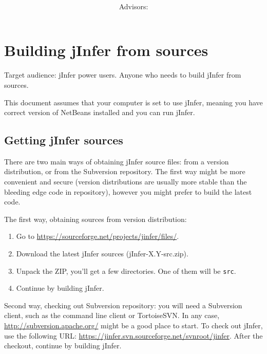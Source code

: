 \documentclass[a4paper,10pt,oneside]{article}
\title{\bf\mftitle}
\author{\mfauthor \\ Advisors: \mfadvisor}
\date{\mfplacedate}
\begin{document}
\maketitle




 
  
 



 \section*{Building jInfer from sources}
\par 
  Target audience: jInfer power users. Anyone who needs to build jInfer from sources.

\par 
  This document assumes that your computer is set to use jInfer, meaning you
    have correct version of NetBeans installed and you can run jInfer.

\subsection*{Getting jInfer sources}
\par 
There are two main ways of obtaining jInfer source files: from a version
  distribution, or from the Subversion repository. The first way might be more
  convenient and secure (version distributions are usually more stable than the
  bleeding edge code in repository), however you might prefer to build the
  latest code.

\par 
\noindent   The first way, obtaining sources from version distribution:
\begin{enumerate}\item 
 Go to \url{https://sourceforge.net/projects/jinfer/files/}.
  \item Download the latest jInfer sources (jInfer-X.Y-src.zip).
  \item Unpack the ZIP, you'll get a few directories. One of them will be \texttt{src}.
  \item Continue by building jInfer.
  \end{enumerate}
\par 
  Second way, checking out Subversion repository: you will need a
  Subversion client, such as the command line client or TortoiseSVN. In any case,
  \url{http://subversion.apache.org/}
might be a good place to start. To check out
  jInfer, use the following URL:
  \url{https://jinfer.svn.sourceforge.net/svnroot/jinfer}.
  After the checkout, continue by building jInfer.
\end{document}
